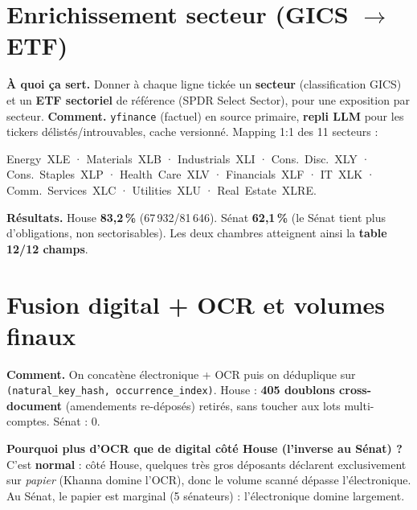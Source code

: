 \documentclass[11pt,a4paper]{article}
\newcommand{\code}[1]{\texttt{\small #1}}
\begin{document}
\section{Enrichissement secteur (GICS $\rightarrow$ ETF)}

\textbf{À quoi ça sert.} Donner à chaque ligne tickée un \textbf{secteur} (classification GICS) et un
\textbf{ETF sectoriel} de référence (SPDR Select Sector), pour une exposition par secteur. \textbf{Comment.}
\code{yfinance} (factuel) en source primaire, \textbf{repli LLM} pour les tickers délistés/introuvables,
cache versionné. Mapping 1:1 des 11 secteurs :

\begin{center}\scriptsize
Energy~XLE · Materials~XLB · Industrials~XLI · Cons.~Disc.~XLY · Cons.~Staples~XLP · Health~Care~XLV ·
Financials~XLF · IT~XLK · Comm.~Services~XLC · Utilities~XLU · Real~Estate~XLRE.
\end{center}

\textbf{Résultats.} House \textbf{83,2\,\%} (67\,932/81\,646). Sénat \textbf{62,1\,\%} (le Sénat tient
plus d'obligations, non sectorisables). Les deux chambres atteignent ainsi la \textbf{table 12/12 champs}.

\section{Fusion digital + OCR et volumes finaux}

\textbf{Comment.} On concatène électronique + OCR puis on déduplique sur \code{(natural\_key\_hash,
occurrence\_index)}. House : \textbf{405 doublons cross-document} (amendements re-déposés) retirés, sans
toucher aux lots multi-comptes. Sénat : 0.

\textbf{Pourquoi plus d'OCR que de digital côté House (l'inverse au Sénat) ?} C'est \textbf{normal} : côté
House, quelques très gros déposants déclarent exclusivement sur \emph{papier} (Khanna domine l'OCR), donc
le volume scanné dépasse l'électronique. Au Sénat, le papier est marginal (5 sénateurs) : l'électronique
domine largement.
\end{document}
